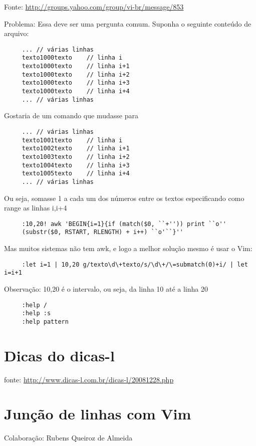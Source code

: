  Fonte: \url{http://groups.yahoo.com/group/vi-br/message/853}

 Problema:
 Essa deve ser uma pergunta comum.
 Suponha o seguinte conteúdo de arquivo:

\begin{verbatim}
     ... // várias linhas
     texto1000texto    // linha i
     texto1000texto    // linha i+1
     texto1000texto    // linha i+2
     texto1000texto    // linha i+3
     texto1000texto    // linha i+4
     ... // várias linhas
\end{verbatim}

Gostaria de um comando que mudasse para

\begin{verbatim}
     ... // várias linhas
     texto1001texto    // linha i
     texto1002texto    // linha i+1
     texto1003texto    // linha i+2
     texto1004texto    // linha i+3
     texto1005texto    // linha i+4
     ... // várias linhas
\end{verbatim}

 Ou seja, somasse 1 a cada um dos números entre os textos
 especificando como range as linhas i,i+4

\begin{verbatim}
     :10,20! awk 'BEGIN{i=1}{if (match($0, ``+'')) print ``o''
     (substr($0, RSTART, RLENGTH) + i++) ``o'``}''
\end{verbatim}

 Mas muitos sistemas não tem awk, e logo a melhor solução mesmo é usar o Vim:

\begin{verbatim}
     :let i=1 | 10,20 g/texto\d\+texto/s/\d\+/\=submatch(0)+i/ | let i=i+1
\end{verbatim}

Observação: 10,20 é o intervalo, ou seja, da linha 10 até a linha 20

\begin{verbatim}
     :help /
     :help :s
     :help pattern
\end{verbatim}

\section{Dicas do dicas-l}

fonte: \url{http://www.dicas-l.com.br/dicas-l/20081228.php}

\section{Junção de linhas com Vim}
\label{Junção de linhas com Vim}
Colaboração: Rubens Queiroz de Almeida

